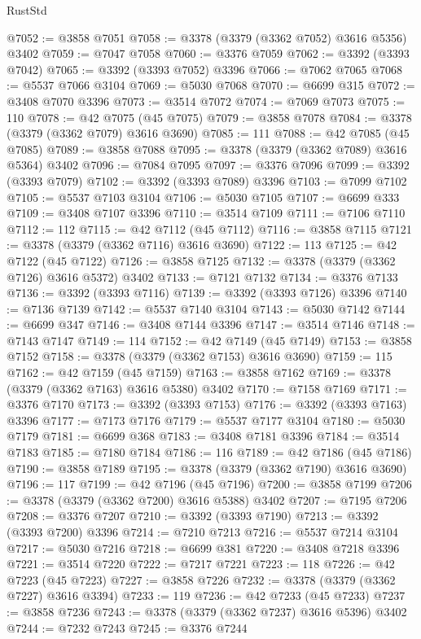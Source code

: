 \begin{lexlean}{RustStd}
\begin{coremodule}
@7052 := @3858 @7051
@7058 := @3378 (@3379 (@3362 @7052) @3616 @5356) @3402
@7059 := @7047 @7058
@7060 := @3376 @7059
@7062 := @3392 (@3393 @7042)
@7065 := @3392 (@3393 @7052) @3396
@7066 := @7062 @7065
@7068 := @5537 @7066 @3104
@7069 := @5030 @7068
@7070 := @6699 @315
@7072 := @3408 @7070 @3396
@7073 := @3514 @7072
@7074 := @7069 @7073
@7075 := 110
@7078 := @42 @7075 (@45 @7075)
@7079 := @3858 @7078
@7084 := @3378 (@3379 (@3362 @7079) @3616 @3690)
@7085 := 111
@7088 := @42 @7085 (@45 @7085)
@7089 := @3858 @7088
@7095 := @3378 (@3379 (@3362 @7089) @3616 @5364) @3402
@7096 := @7084 @7095
@7097 := @3376 @7096
@7099 := @3392 (@3393 @7079)
@7102 := @3392 (@3393 @7089) @3396
@7103 := @7099 @7102
@7105 := @5537 @7103 @3104
@7106 := @5030 @7105
@7107 := @6699 @333
@7109 := @3408 @7107 @3396
@7110 := @3514 @7109
@7111 := @7106 @7110
@7112 := 112
@7115 := @42 @7112 (@45 @7112)
@7116 := @3858 @7115
@7121 := @3378 (@3379 (@3362 @7116) @3616 @3690)
@7122 := 113
@7125 := @42 @7122 (@45 @7122)
@7126 := @3858 @7125
@7132 := @3378 (@3379 (@3362 @7126) @3616 @5372) @3402
@7133 := @7121 @7132
@7134 := @3376 @7133
@7136 := @3392 (@3393 @7116)
@7139 := @3392 (@3393 @7126) @3396
@7140 := @7136 @7139
@7142 := @5537 @7140 @3104
@7143 := @5030 @7142
@7144 := @6699 @347
@7146 := @3408 @7144 @3396
@7147 := @3514 @7146
@7148 := @7143 @7147
@7149 := 114
@7152 := @42 @7149 (@45 @7149)
@7153 := @3858 @7152
@7158 := @3378 (@3379 (@3362 @7153) @3616 @3690)
@7159 := 115
@7162 := @42 @7159 (@45 @7159)
@7163 := @3858 @7162
@7169 := @3378 (@3379 (@3362 @7163) @3616 @5380) @3402
@7170 := @7158 @7169
@7171 := @3376 @7170
@7173 := @3392 (@3393 @7153)
@7176 := @3392 (@3393 @7163) @3396
@7177 := @7173 @7176
@7179 := @5537 @7177 @3104
@7180 := @5030 @7179
@7181 := @6699 @368
@7183 := @3408 @7181 @3396
@7184 := @3514 @7183
@7185 := @7180 @7184
@7186 := 116
@7189 := @42 @7186 (@45 @7186)
@7190 := @3858 @7189
@7195 := @3378 (@3379 (@3362 @7190) @3616 @3690)
@7196 := 117
@7199 := @42 @7196 (@45 @7196)
@7200 := @3858 @7199
@7206 := @3378 (@3379 (@3362 @7200) @3616 @5388) @3402
@7207 := @7195 @7206
@7208 := @3376 @7207
@7210 := @3392 (@3393 @7190)
@7213 := @3392 (@3393 @7200) @3396
@7214 := @7210 @7213
@7216 := @5537 @7214 @3104
@7217 := @5030 @7216
@7218 := @6699 @381
@7220 := @3408 @7218 @3396
@7221 := @3514 @7220
@7222 := @7217 @7221
@7223 := 118
@7226 := @42 @7223 (@45 @7223)
@7227 := @3858 @7226
@7232 := @3378 (@3379 (@3362 @7227) @3616 @3394)
@7233 := 119
@7236 := @42 @7233 (@45 @7233)
@7237 := @3858 @7236
@7243 := @3378 (@3379 (@3362 @7237) @3616 @5396) @3402
@7244 := @7232 @7243
@7245 := @3376 @7244

\end{coremodule}
\end{lexlean}

